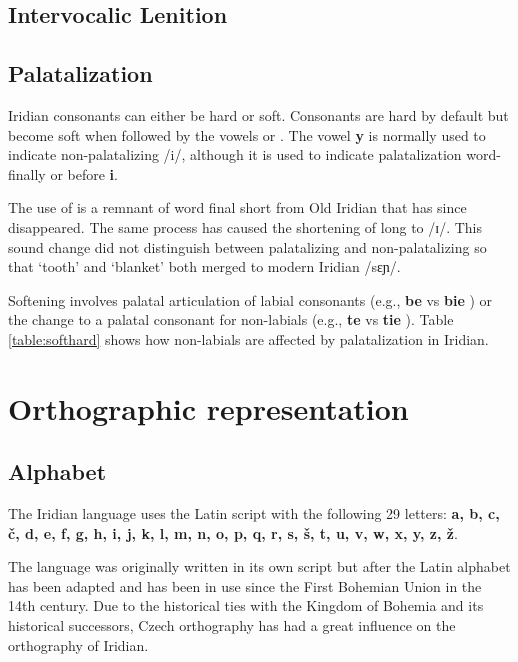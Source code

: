 \subsection{Intervocalic Lenition}




\subsection{Palatalization}
\par Iridian consonants can either be hard or soft. Consonants are hard by default but become soft when followed by the vowels  or . The vowel \textbf{y} is normally used to indicate non-palatalizing /i/, although it is used to indicate palatalization word-finally or before \textbf{i}.

\par The use of  is a remnant of word final short  from Old Iridian that has since disappeared. The same process has caused the shortening of long  to /ɪ/. This sound change did not distinguish between palatalizing and non-palatalizing  so that  `tooth' and  `blanket' both merged to modern Iridian  /sɛɲ/.

\par Softening involves palatal articulation of labial consonants (e.g., \textbf{be} \textipa{[bE]} vs \textbf{bie} \textipa{[b\sx{j}E]}) or the change to a palatal consonant for non-labials (e.g., \textbf{te} \textipa{[tE]} vs \textbf{tie} \textipa{[cE]}). Table \ref{table:softhard} shows how non-labials are affected by palatalization in Iridian.

\section{Orthographic representation}
\subsection{Alphabet}

\par The Iridian language uses the Latin script with the following 29 letters: \textbf{a, b, c, č, d, e, f, g, h, i, j, k, l, m, n, o, p, q, r, s, š, t, u, v, w, x, y, z, ž}.

The language was originally written in its own script but after the Latin alphabet has been adapted and has been in use since the First Bohemian Union in the 14th century. Due to the historical ties with the Kingdom of Bohemia and its historical successors, Czech orthography has had a great influence on the orthography of Iridian.

